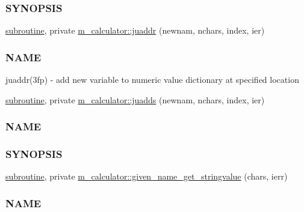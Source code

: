 \begin{DoxyCompactItemize}
\begin{DoxyCompactList}
\subsubsection*{S\+Y\+N\+O\+P\+S\+IS}\end{DoxyCompactList}\item 
\hyperlink{M__stopwatch_83_8txt_acfbcff50169d691ff02d4a123ed70482}{subroutine}, private \hyperlink{namespacem__calculator_a9306409f00c5ba6200bb68ca672b6053}{m\+\_\+calculator\+::juaddr} (newnam, nchars, index, ier)
\begin{DoxyCompactList}\small\item\em \subsubsection*{N\+A\+ME}

juaddr(3fp) -\/ add new variable to numeric value dictionary at specified location \end{DoxyCompactList}\item 
\hyperlink{M__stopwatch_83_8txt_acfbcff50169d691ff02d4a123ed70482}{subroutine}, private \hyperlink{namespacem__calculator_a6d54137f485f8d2ed239b58e44cdb732}{m\+\_\+calculator\+::juadds} (newnam, nchars, index, ier)
\begin{DoxyCompactList}\small\item\em \subsubsection*{N\+A\+ME}

\subsubsection*{S\+Y\+N\+O\+P\+S\+IS}\end{DoxyCompactList}\item 
\hyperlink{M__stopwatch_83_8txt_acfbcff50169d691ff02d4a123ed70482}{subroutine}, private \hyperlink{namespacem__calculator_a28e87f9e58861836dd6f7dec4bbb9311}{m\+\_\+calculator\+::given\+\_\+name\+\_\+get\+\_\+stringvalue} (chars, ierr)
\begin{DoxyCompactList}\small\item\em \subsubsection*{N\+A\+ME}


\end{DoxyCompactList}
\end{DoxyCompactItemize}

